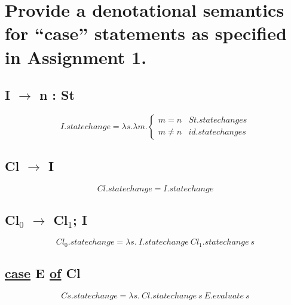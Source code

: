 \section{Provide a denotational semantics for ``case'' statements as specified in Assignment 1.}
\subsection{I $\rightarrow$ n : St}
\begin{equation}
	I.statechange = \lambda s. \lambda m. \left\{
		\begin{array}{rl}
			m = n		& St.statechange s \\
			m \neq n	& id.statechange s
		\end{array} \right.
\end{equation}

\subsection{Cl $\rightarrow$ I}
\begin{equation}
	Cl.statechange = I.statechange
\end{equation}

\subsection{Cl$_0$ $\rightarrow$ Cl$_1$; I}
\begin{equation}
	Cl_0.statechange = \lambda s. \ I.statechange \ Cl_1.statechange \ s
\end{equation}

\subsection{\underline{case} E \underline{of} Cl}
\begin{equation}
	Cs.statechange = \lambda s. \ Cl.statechange \ s \ E.evaluate \ s
\end{equation}